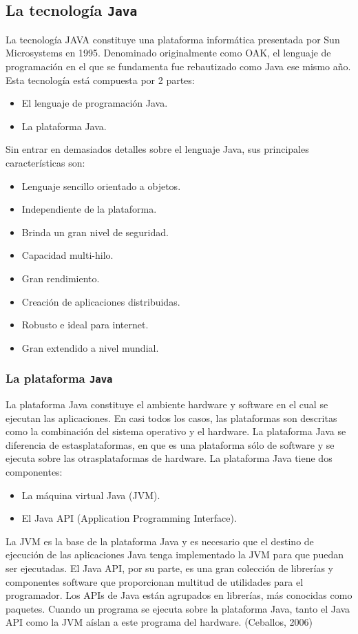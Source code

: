 
  \subsection{La tecnología \texttt{Java}}
La tecnología JAVA constituye una plataforma informática presentada por Sun
Microsystems en 1995. Denominado originalmente como OAK, el lenguaje de
programación en el que se fundamenta fue rebautizado como Java ese mismo año.
Esta tecnología está compuesta por 2 partes:
\begin{itemize}
\item El lenguaje de programación Java.
\item La plataforma Java.
\end{itemize}
Sin entrar en demasiados detalles sobre el lenguaje Java, sus principales
características son:
\begin{itemize}
\item Lenguaje sencillo orientado a objetos.
\item Independiente de la plataforma.
\item Brinda un gran nivel de seguridad.
\item Capacidad multi-hilo.
\item Gran rendimiento.
\item Creación de aplicaciones distribuidas.
\item Robusto e ideal para internet.
\item Gran extendido a nivel mundial.
\end{itemize}

\subsubsection{La plataforma \texttt{Java}}
La plataforma Java constituye el ambiente hardware y software en el cual se
ejecutan las aplicaciones. En casi todos los casos, las plataformas son 
descritas como la combinación del sistema operativo y el hardware. La 
plataforma Java se diferencia de estasplataformas, en que es una plataforma 
sólo de software y se ejecuta sobre las otrasplataformas de hardware.
La plataforma Java tiene dos componentes:
\begin{itemize}
\item La máquina virtual Java (JVM).
\item El Java API (Application Programming Interface).
\end{itemize}
La JVM es la base de la plataforma Java y es necesario que el destino de 
ejecución de las aplicaciones Java tenga implementado la JVM para que puedan 
ser ejecutadas.
El Java API, por su parte, es una gran colección de librerías y componentes
software que proporcionan multitud de utilidades para el programador. Los APIs 
de Java están agrupados en librerías, más conocidas como paquetes.
Cuando un programa se ejecuta sobre la plataforma Java, tanto el Java API como 
la JVM aíslan a este programa del hardware. (Ceballos, 2006)

